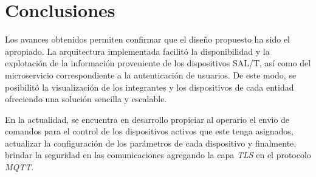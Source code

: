 
\section{Conclusiones}

Los avances obtenidos permiten confirmar que el diseño propuesto ha sido el apropiado. La arquitectura implementada facilitó la disponibilidad y la explotación de la información proveniente de los dispositivos SAL/T, así como del microservicio correspondiente a la autenticación de usuarios.
De este modo, se posibilitó la visualización de los integrantes y los dispositivos de cada entidad ofreciendo una solución sencilla y escalable. 

En la actualidad, se encuentra en desarrollo propiciar al operario el envio de comandos para el control de los dispositivos activos que este tenga asignados, actualizar la configuración de los parámetros de cada dispositivo
y finalmente, brindar la seguridad en las comunicaciones agregando la capa \textit{TLS} en el protocolo \textit{MQTT}.
